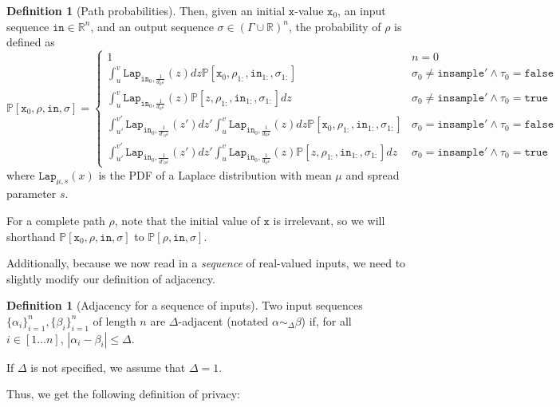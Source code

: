 \documentclass[12pt]{article}
\newcommand{\RR}{\mathbb{R}}
\newcommand{\PP}{\mathbb{P}}
\newcommand{\Lap}{\texttt{Lap}}
\theoremstyle{definition}
\newtheorem{defn}[thm]{Definition}
\begin{document}
\begin{defn}[Path probabilities]
    Then, given an initial $\texttt{x}$-value $\texttt{x}_0$, an input sequence $\texttt{in}\in \RR^n$, and an output sequence $\sigma\in (\Gamma\cup\RR)^n$, the probability of $\rho$ is defined as \[
        \PP[\texttt{x}_0, \rho, \texttt{in}, \sigma] = \begin{cases}
            1 & n = 0\\
            \int_u^v \Lap_{\texttt{in}_0, \frac{1}{d_0\varepsilon}}(z)dz\PP[\texttt{x}_0, \rho_{1:}, \texttt{in}_{1:}, \sigma_{1:}] & \sigma_0 \neq \texttt{insample}' \land \tau_0 = \texttt{false}\\
            \int_u^v \Lap_{\texttt{in}_0, \frac{1}{d_0\varepsilon}}(z)\PP[z, \rho_{1:}, \texttt{in}_{1:}, \sigma_{1:}]dz  & \sigma_0 \neq \texttt{insample}'\land \tau_0=\texttt{true} \\
            \int_{u'}^{v'}\Lap_{\texttt{in}_0, \frac{1}{d'_0\varepsilon}}(z')dz'\int_u^v \Lap_{\texttt{in}_0, \frac{1}{d_0\varepsilon}}(z)dz\PP[\texttt{x}_0, \rho_{1:}, \texttt{in}_{1:}, \sigma_{1:}]& \sigma_0 = \texttt{insample}'\land \tau_0 = \texttt{false}\\
            \int_{u'}^{v'}\Lap_{\texttt{in}_0, \frac{1}{d'_0\varepsilon}}(z')dz'\int_u^v \Lap_{\texttt{in}_0, \frac{1}{d_0\varepsilon}}(z)\PP[z, \rho_{1:}, \texttt{in}_{1:}, \sigma_{1:}]dz& \sigma_0 = \texttt{insample}'\land \tau_0 = \texttt{true}
        \end{cases}
    \]
    where $\Lap_{\mu, s}(x)$ is the PDF of a Laplace distribution with mean $\mu$ and spread parameter $s$.
\end{defn}

For a complete path $\rho$, note that the initial value of $\texttt{x}$ is irrelevant, so we will shorthand $\PP[\texttt{x}_0, \rho, \texttt{in}, \sigma]$ to $\PP[\rho, \texttt{in}, \sigma]$.

Additionally, because we now read in a \textit{sequence} of real-valued inputs, we need to slightly modify our definition of adjacency.

\begin{defn}[Adjacency for a sequence of inputs]
    Two input sequences $\{\alpha_i\}_{i=1}^n, \{\beta_i\}_{i=1}^n$ of length $n$ are $\Delta$-adjacent (notated $\alpha \sim_{\Delta}\beta$) if, for all $i\in [1\ldots n]$, $|\alpha_i-\beta_i|\leq \Delta$. 

    If $\Delta$ is not specified, we assume that $\Delta = 1$. 
\end{defn}

Thus, we get the following definition of privacy:
\end{document}
